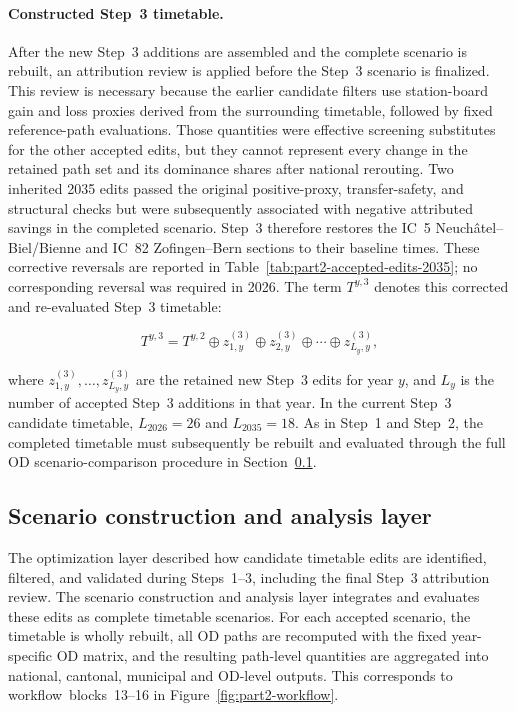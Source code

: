 \documentclass[preprint,12pt]{elsarticle}
\begin{document}
\paragraph*{Constructed Step~3 timetable.}
After the new Step~3 additions are assembled and the complete scenario is rebuilt, an attribution review is applied before the Step~3 scenario is finalized. This review is necessary because the earlier candidate filters use station-board gain and loss proxies derived from the surrounding timetable, followed by fixed reference-path evaluations. Those quantities were effective screening substitutes for the other accepted edits, but they cannot represent every change in the retained path set and its dominance shares after national rerouting. Two inherited 2035 edits passed the original positive-proxy, transfer-safety, and structural checks but were subsequently associated with negative attributed savings in the completed scenario. Step~3 therefore restores the IC~5 Neuchâtel--Biel/Bienne and IC~82 Zofingen--Bern sections to their baseline times. These corrective reversals are reported in Table~\ref{tab:part2-accepted-edits-2035}; no corresponding reversal was required in 2026. The term \(T^{y,3}\) denotes this corrected and re-evaluated Step~3 timetable:


\begin{equation}
T^{y,3}
=
T^{y,2}
\oplus
z^{(3)}_{1,y}
\oplus
z^{(3)}_{2,y}
\oplus
\cdots
\oplus
z^{(3)}_{L_y,y},
\label{eq:part2-step3-timetable}
\end{equation}

where \(z^{(3)}_{1,y},\ldots,z^{(3)}_{L_y,y}\) are the retained new Step~3 edits for year \(y\), and \(L_y\) is the number of accepted Step~3 additions in that year. In the current Step~3 candidate timetable, \(L_{2026}=26\) and \(L_{2035}=18\). As in Step~1 and Step~2, the completed timetable must subsequently be rebuilt and evaluated through the full OD scenario-comparison procedure in Section~\ref{sec:methods-part2-analysis}.


\subsection{Scenario construction and analysis layer}\label{sec:methods-part2-analysis}
The optimization layer described how candidate timetable edits are identified, filtered, and validated during Steps~1--3, including the final Step~3 attribution review. The scenario construction and analysis layer integrates and evaluates these edits as complete timetable scenarios. For each accepted scenario, the timetable is wholly rebuilt, all OD paths are recomputed with the fixed year-specific OD matrix, and the resulting path-level quantities are aggregated into national, cantonal, municipal and OD-level outputs. This corresponds to workflow~blocks~13--16 in Figure~\ref{fig:part2-workflow}. 
\end{document}
